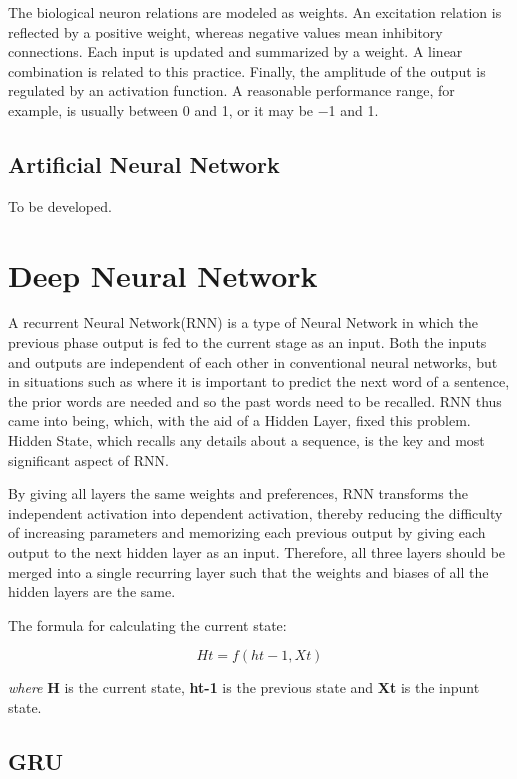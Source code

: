 The biological neuron relations are modeled as weights. An excitation relation is reflected by a positive weight, whereas negative values mean inhibitory connections. Each input is updated and summarized by a weight. A linear combination is related to this practice. Finally, the amplitude of the output is regulated by an activation function. A reasonable performance range, for example, is usually between 0 and 1, or it may be −1 and 1.

\subsection{Artificial Neural Network}

To be developed.

\section{Deep Neural Network}

A recurrent Neural Network(RNN) is a type of Neural Network in which the previous phase output is fed to the current stage as an input. Both the inputs and outputs are independent of each other in conventional neural networks, but in situations such as where it is important to predict the next word of a sentence, the prior words are needed and so the past words need to be recalled. RNN thus came into being, which, with the aid of a Hidden Layer, fixed this problem. Hidden State, which recalls any details about a sequence, is the key and most significant aspect of RNN.\cite{jain1999recurrent}

By giving all layers the same weights and preferences, RNN transforms the independent activation into dependent activation, thereby reducing the difficulty of increasing parameters and memorizing each previous output by giving each output to the next hidden layer as an input.
Therefore, all three layers should be merged into a single recurring layer such that the weights and biases of all the hidden layers are the same.

The formula for calculating the current state:

\[Ht = f(ht-1, Xt)\]

\textit{where} \textbf{H} is the current state, \textbf{ht-1} is the previous state and \textbf{Xt} is the inpunt state.

\subsection{GRU}  %
